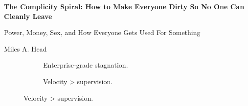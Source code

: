 \documentclass{article}
\begin{document}
  \onehalfspacing
  \setlength{\parskip}{1.5em} 



  \begin{titlepage}
    \centering
  
    {\LARGE\bfseries The Complicity Spiral: How to Make Everyone Dirty So No One Can Cleanly Leave \par}
    \vspace{1em}
    {\large Power, Money, Sex, and How Everyone Gets Used For Something \par}
    {\small Miles A. Head \par}
    
  
    \vfill


  
    \begin{figure}[H]
      \centering
      
      \begin{subfigure}[t]{0.45\textwidth}
      \centering
      \caption*{Enterprise-grade stagnation.}
      \end{subfigure}
      \hfill
      \begin{subfigure}[t]{0.45\textwidth}
      \centering
      \caption*{Velocity > supervision.}
      \end{subfigure}
      
      \vspace{1em}
      

\end{figure}
\end{titlepage}
\end{document}
